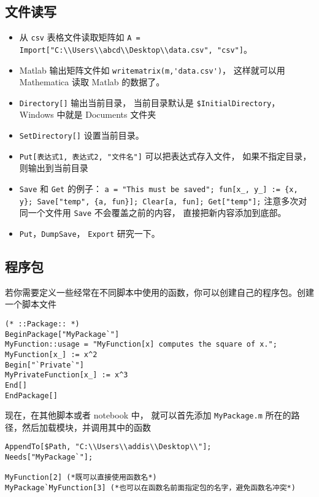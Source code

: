 \subsection{文件读写}
\begin{itemize}
\item 从 \verb`csv` 表格文件读取矩阵如 \verb`A = Import["C:\\Users\\abcd\\Desktop\\data.csv", "csv"]`。
\item Matlab 输出矩阵文件如 \verb`writematrix(m,'data.csv')`， 这样就可以用 Mathematica 读取 Matlab 的数据了。
\item \verb`Directory[]` 输出当前目录， 当前目录默认是 \verb`$InitialDirectory`， Windows 中就是 Documents 文件夹
\item \verb`SetDirectory[]` 设置当前目录。
\item \verb`Put[表达式1, 表达式2, "文件名"]` 可以把表达式存入文件， 如果不指定目录， 则输出到当前目录
\item \verb`Save` 和 \verb`Get` 的例子： \verb`a = "This must be saved"; fun[x_, y_] := {x, y}; Save["temp", {a, fun}]; Clear[a, fun]; Get["temp"];` 注意多次对同一个文件用 \verb`Save` 不会覆盖之前的内容， 直接把新内容添加到底部。
\item \verb`Put`，\verb`DumpSave`， \verb`Export` 研究一下。
\end{itemize}

\subsection{程序包}
若你需要定义一些经常在不同脚本中使用的函数，你可以创建自己的程序包。创建一个脚本文件
\begin{lstlisting}[language=mma,caption=MyPackage.m]
(* ::Package:: *)
BeginPackage["MyPackage`"]
MyFunction::usage = "MyFunction[x] computes the square of x.";
MyFunction[x_] := x^2
Begin["`Private`"]
MyPrivateFunction[x_] := x^3
End[]
EndPackage[]
\end{lstlisting}
现在，在其他脚本或者 notebook 中， 就可以首先添加 \verb`MyPackage.m` 所在的路径，然后加载模块，并调用其中的函数
\begin{lstlisting}[language=mma]
AppendTo[$Path, "C:\\Users\\addis\\Desktop\\"];
Needs["MyPackage`"];

MyFunction[2] (*既可以直接使用函数名*)
MyPackage`MyFunction[3] (*也可以在函数名前面指定包的名字，避免函数名冲突*)
\end{lstlisting}


